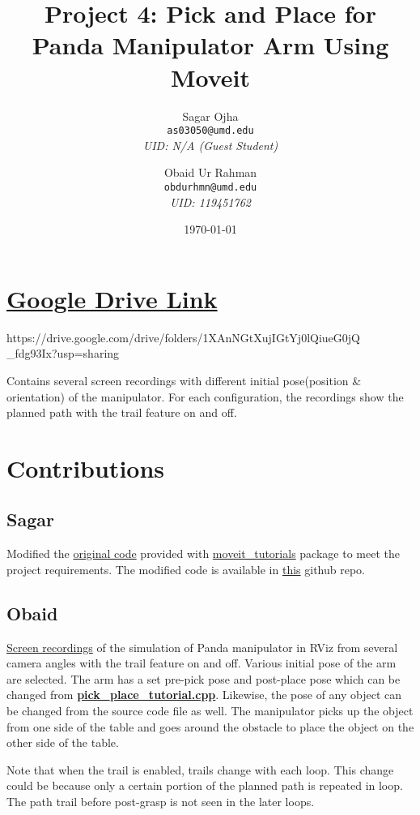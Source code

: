 \documentclass[12pt]{extarticle}
\title{Project 4: Pick and Place for Panda Manipulator Arm Using Moveit}
\author{
	Sagar Ojha \\
	\texttt{as03050@umd.edu}\\
	\textit{UID: N/A (Guest Student)}
	\and
	Obaid Ur Rahman\\
	\texttt{obdurhmn@umd.edu}\\
	\textit{UID: 119451762}}
\date{\today}
\begin{document}
\maketitle
\newpage
\section{\href{https://drive.google.com/drive/folders/1XAnNGtXujIGtYj0lQiueG0jQ_fdg93Ix?usp=sharing}{Google Drive Link}}
\hspace{\parindent} https://drive.google.com/drive/folders/1XAnNGtXujIGtYj0lQiueG0jQ
\_fdg93Ix?usp=sharing

Contains several screen recordings with different initial pose(position \& orientation) of the manipulator. For each configuration, the recordings show the planned path with the trail feature on and off.

\section{Contributions}
\subsection{Sagar}
\hspace{\parindent} Modified the \href{https://github.com/ros-planning/moveit_tutorials/blob/master/doc/pick_place/src/pick_place_tutorial.cpp}{original code} provided with \href{https://ros-planning.github.io/moveit_tutorials/doc/getting_started/getting_started.html}{moveit\_tutorials} package to meet the project requirements. The modified code is available in \href{https://github.com/Sagar-Ojha/ENPM-661/tree/main/Project4}{this} github repo.

\subsection{Obaid}
\hspace{\parindent} \href{https://drive.google.com/drive/folders/1XAnNGtXujIGtYj0lQiueG0jQ_fdg93Ix?usp=sharing}{Screen recordings} of the simulation of Panda manipulator in RViz from several camera angles with the trail feature on and off. Various initial pose of the arm are selected. The arm has a set pre-pick pose and post-place pose which can be changed from \href{https://github.com/Sagar-Ojha/ENPM-661/tree/main/Project4}{\textbf{pick\_place\_tutorial.cpp}}. Likewise, the pose of any object can be changed from the source code file as well. The manipulator picks up the object from one side of the table and goes around the obstacle to place the object on the other side of the table.

Note that when the trail is enabled, trails change with each loop. This change could be because only a certain portion of the planned path is repeated in loop. The path trail before post-grasp is not seen in the later loops.
\end{document}
